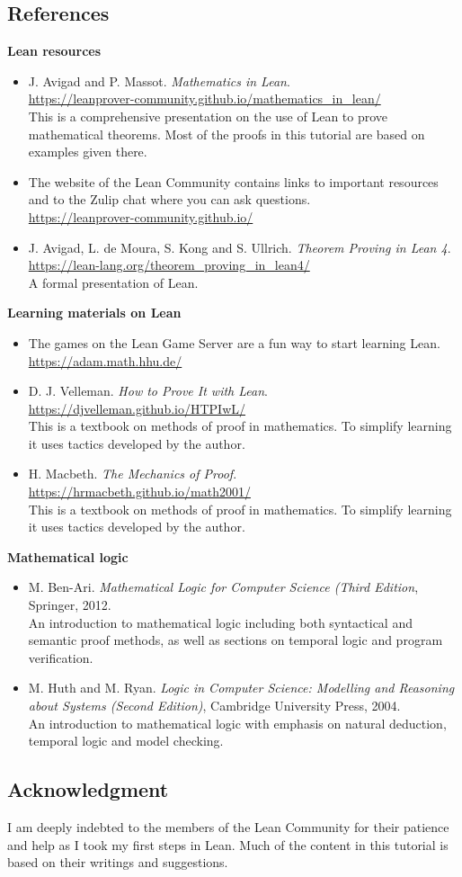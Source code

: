 \subsection*{References}
\textbf{Lean resources}
\begin{itemize}
\item J. Avigad and P. Massot. \textit{Mathematics in Lean}.\\
\indnt\url{https://leanprover-community.github.io/mathematics_in_lean/}\\
This is a comprehensive presentation on the use of Lean to prove mathematical theorems. Most of the proofs in this tutorial are based on examples given there.
\item The website of the Lean Community contains links to important resources and to the Zulip chat where you can ask questions.\\
\indnt{}\url{https://leanprover-community.github.io/}
\item J. Avigad, L. de Moura, S. Kong and S. Ullrich. 
\textit{Theorem Proving in Lean 4}. \\
\indnt{}\url{https://lean-lang.org/theorem_proving_in_lean4/}\\
A formal presentation of Lean.
\end{itemize}
\textbf{Learning materials on Lean}
\begin{itemize}
\item The games on the Lean Game Server are a fun way to start learning Lean.\\
\indnt{}\url{https://adam.math.hhu.de/}
\item D. J. Velleman. \textit{How to Prove It with Lean}.\\
\indnt{}\url{https://djvelleman.github.io/HTPIwL/}\\
This is a textbook on methods of proof in mathematics. To simplify learning it uses tactics developed by the author.
\item H. Macbeth. \textit{The Mechanics of Proof}.\\
\indnt{}\url{https://hrmacbeth.github.io/math2001/}\\
This is a textbook on methods of proof in mathematics. To simplify learning it uses tactics developed by the author.
\end{itemize}
\textbf{Mathematical logic}
\begin{itemize}
\item M. Ben-Ari. \textit{Mathematical Logic for Computer Science (Third Edition}, Springer, 2012.\\
An introduction to mathematical logic including both syntactical and semantic proof methods, as well as sections on temporal logic and program verification.
\item M. Huth and M. Ryan. \textit{Logic in Computer Science: Modelling and Reasoning about Systems (Second Edition)}, Cambridge University Press, 2004.\\
An introduction to mathematical logic with emphasis on natural deduction, temporal logic and model checking.
\end{itemize}

\subsection*{Acknowledgment}

I am deeply indebted to the members of the Lean Community for their patience and help as I took my first steps in Lean. Much of the content in this tutorial is based on their writings and suggestions.

